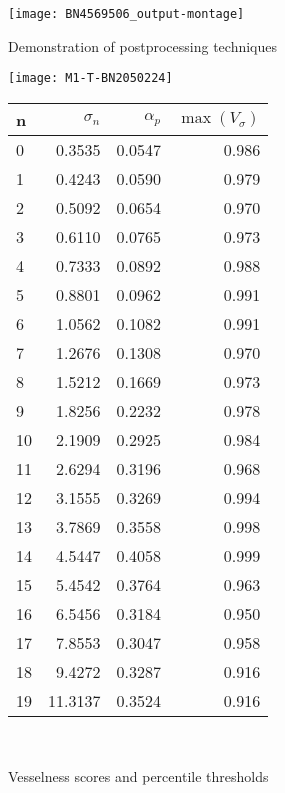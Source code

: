 \begin{figure}
\centering
\texttt{[image: BN4569506\_output-montage]}
\caption{Demonstration of postprocessing techniques}
\label{fig:segmentation-demo}
\end{figure}

\begin{figure}
	\begin{minipage}[tp]{0.5\textwidth}
		\texttt{[image: M1-T-BN2050224]}
	\end{minipage}
	\quad
	\begin{minipage}[tp]{0.35\textwidth}
		\begin{tabular}{l|r|r|r}
			n  & $\sigma_n$  &  $\alpha_p$  &  $\max(V_\sigma)$ \\
			\hline
			0  &   0.3535 &  0.0547 &  0.986\\
			1  &   0.4243 &  0.0590 &  0.979\\
			2  &   0.5092 &  0.0654 &  0.970\\
			3  &   0.6110 &  0.0765 &  0.973\\
			4  &   0.7333 &  0.0892 &  0.988\\
			5  &   0.8801 &  0.0962 &  0.991\\
			6  &   1.0562 &  0.1082 &  0.991\\
			7  &   1.2676 &  0.1308 &  0.970\\
			8  &   1.5212 &  0.1669 &  0.973\\
			9  &   1.8256 &  0.2232 &  0.978\\
			10 &   2.1909 &  0.2925 &  0.984\\
			11 &   2.6294 &  0.3196 &  0.968\\
			12 &   3.1555 &  0.3269 &  0.994\\
			13 &   3.7869 &  0.3558 &  0.998\\
			14 &   4.5447 &  0.4058 &  0.999\\
			15 &   5.4542 &  0.3764 &  0.963\\
			16 &   6.5456 &  0.3184 &  0.950\\
			17 &   7.8553 &  0.3047 &  0.958\\
			18 &   9.4272 &  0.3287 &  0.916\\
			19 &  11.3137 &  0.3524 &  0.916\\
		\end{tabular} \\
	\end{minipage}
	\caption{Vesselness scores and percentile thresholds}
\end{figure}

